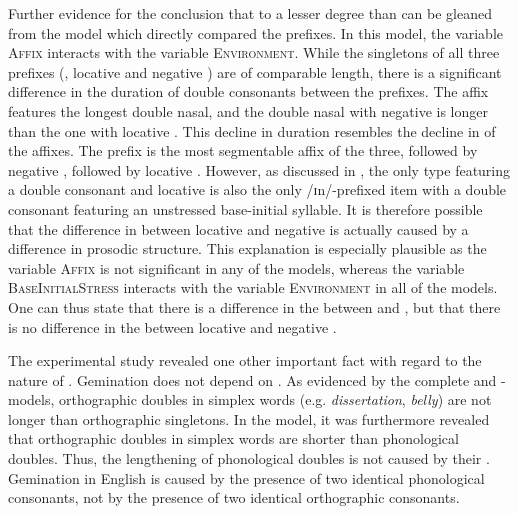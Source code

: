 Further evidence for the conclusion that   to a lesser degree than  can be gleaned from the model which directly compared the prefixes. In this model, the variable \textsc{Affix} interacts with the variable \textsc{Environment}. 
While the singletons of all three prefixes (, locative  and negative ) are of comparable length, there is a significant difference in the duration of double consonants between the prefixes. The affix  features the longest double nasal,  and the double nasal with negative  is longer than the one with locative . This decline in duration resembles the decline in  of the affixes. The prefix  is the most segmentable affix of the three, followed by negative , followed by locative . However, as discussed in , the only type featuring a double consonant and locative  is also the only /ɪn/-prefixed item with a double consonant featuring an unstressed base-initial syllable. It is therefore possible that the difference in  between locative and negative  is actually caused by a difference in prosodic structure. This explanation is especially plausible as the variable \textsc{Affix} is not significant in any of the models, whereas the variable \textsc{BaseInitialStress} interacts with the variable \textsc{Environment} in all of the models. 
One can thus state that there is a difference in the  between  and , but that there is no difference in the  between locative and negative .


The experimental study revealed one other important fact with regard to the nature of . Gemination does not depend on . As evidenced by the complete  and -models, orthographic doubles in simplex words (e.g. \textit{dissertation}, \textit{belly}) are not longer than orthographic singletons. 
In the model, it was furthermore revealed that orthographic doubles in simplex words are shorter than phonological doubles. 
Thus, the lengthening of phonological doubles is not caused by their . %
Gemination in English is caused by the presence of two identical phonological consonants, not by the presence of two identical orthographic consonants.

